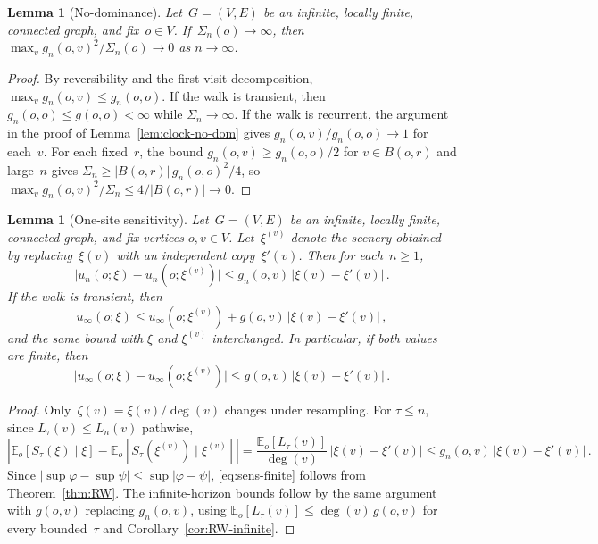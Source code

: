 \documentclass[aop]{imsart}
\theoremstyle{plain}
\newtheorem{lemma}[theorem]{Lemma}
\theoremstyle{definition}
\newcommand{\E}{\mathbb{E}}
\begin{document}
	\begin{lemma}[No-dominance]\label{lem:no-dominance}
		Let~$G=(V,E)$ be an infinite, locally finite, connected graph, and fix~$o\in V$.
		If~$\Sigma_n(o)\to\infty$, then $\max_{v}g_n(o,v)^2/\Sigma_n(o)\to 0$ as $n\to\infty$.
	\end{lemma}
	\begin{proof}
		By reversibility and the first-visit decomposition, $\max_v g_n(o,v)\leq g_n(o,o)$. If the walk is transient, then $g_n(o,o)\leq g(o,o)<\infty$ while $\Sigma_n\to\infty$. If the walk is recurrent, the argument in the proof of Lemma~\ref{lem:clock-no-dom} gives $g_n(o,v)/g_n(o,o)\to 1$ for each~$v$. For each fixed~$r$, the bound $g_n(o,v)\geq g_n(o,o)/2$ for $v\in B(o,r)$ and large~$n$ gives $\Sigma_n\geq|B(o,r)|\,g_n(o,o)^2/4$, so $\max_v g_n(o,v)^2/\Sigma_n\leq 4/|B(o,r)|\to 0$.
	\end{proof}
	\begin{lemma}[One-site sensitivity]\label{lem:sensitivity}
		Let~$G=(V,E)$ be an infinite, locally finite, connected graph, and fix
		vertices $o, v\in V$. Let~$\xi^{(v)}$ denote the scenery obtained by replacing~$\xi(v)$ with an independent copy~$\xi'(v)$.
		Then for each~$n\geq 1$,
		\begin{equation}\label{eq:sens-finite}
			\bigl|u_n(o;\xi)-u_n(o;\xi^{(v)})\bigr|
			\leq g_n(o,v)\,|\xi(v)-\xi'(v)|\,.
		\end{equation}
		If the walk is transient, then
		\[
		u_\infty(o;\xi)\leq u_\infty(o;\xi^{(v)})+g(o,v)\,|\xi(v)-\xi'(v)|\,,
		\]
		and the same bound with $\xi$ and $\xi^{(v)}$ interchanged. In particular, if both values are finite, then
		\begin{equation}
			\bigl|u_\infty(o;\xi)-u_\infty(o;\xi^{(v)})\bigr|
			\leq g(o,v)\,|\xi(v)-\xi'(v)|\,.
		\end{equation}
	\end{lemma}
	\begin{proof}
		Only~$\zeta(v)=\xi(v)/\deg(v)$ changes under resampling. For $\tau\leq n$, since $L_\tau(v)\leq L_n(v)$ pathwise,
		\[
		\left|\E_o[S_\tau(\xi)\mid\xi]-\E_o[S_\tau(\xi^{(v)})\mid\xi^{(v)}]\right|
		=\frac{\E_o[L_\tau(v)]}{\deg(v)}\,|\xi(v)-\xi'(v)|
		\leq g_n(o,v)\,|\xi(v)-\xi'(v)|\,.
		\]
		Since $|\sup\varphi-\sup\psi|\leq\sup|\varphi-\psi|$, \eqref{eq:sens-finite} follows from Theorem~\ref{thm:RW}. The infinite-horizon bounds follow by the same argument with $g(o,v)$ replacing $g_n(o,v)$, using $\E_o[L_\tau(v)]\leq\deg(v)\,g(o,v)$ for every bounded~$\tau$ and Corollary~\ref{cor:RW-infinite}.
	\end{proof}
	
\end{document}
